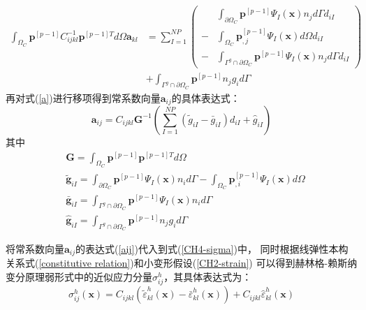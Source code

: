 \begin{equation}\label{a}
\begin{split}
        \int_{\Omega_C}\pmb{p}^{[p-1]}C^{-1}_{ijkl}\pmb{p}^{[p-1]T}d\Omega\pmb{a}_{kl}&=\sum_{I=1}^{N\!P}
        \left (
            \begin{split}
                &\int_{\partial\Omega_C}\pmb{p}^{[p-1]}\Psi_I(\pmb{x})n_jd\Gamma d_{iI} \\
               -&\int_{\Omega_C}\pmb{p}_{,j}^{[p-1]}\Psi_{I}(\pmb{x})d\Omega d_{iI}\\
               -&\int_{\Gamma^g\cap\partial\Omega_C}\pmb{p}^{[p-1]}\Psi_I(\pmb{x})n_jd\Gamma d_{iI}
            \end{split}
         \right ) \\
         &+\int_{\Gamma^g\cap\partial\Omega_C}\pmb{p}^{[p-1]}n_jg_id\Gamma
\end{split}
\end{equation}
再对式(\ref{a})进行移项得到常系数向量$\pmb{a}_{ij}$的具体表达式：
\begin{equation}\label{aij}
 \pmb{a}_{ij}=C_{ijkl}\pmb{G}^{-1}(\sum_{I=1}^{N\!P}(\tilde{g}_{iI}-\bar{g}_{iI})d_{iI}+\hat{g}_{iI})
\end{equation}
其中
\begin{subequations}
\begin{align}
    \label{g1}&\pmb{G}=\int_{\Omega_C}\pmb{p}^{[p-1]}\pmb{p}^{[p-1]T}d\Omega\\
    \label{g2} &\tilde{\pmb g}_{iI}=\int_{\partial\Omega_C}\pmb{p}^{[p-1]}\Psi_I(\pmb{x})n_id\Gamma-\int_{\Omega_C}\pmb{p}_{,i}^{[p-1]}\Psi_{I}(\pmb{x})d\Omega\\
    \label{g3} &\bar{\pmb g}_{iI}=\int_{\Gamma^g\cap\partial\Omega_C}\pmb{p}^{[p-1]}\Psi_I(\pmb{x})n_id\Gamma\\
   \label{g4} &\hat{\pmb g}_{iI}=\int_{\Gamma^g\cap\partial\Omega_C}\pmb{p}^{[p-1]}n_jg_id\Gamma
\end{align}
\end{subequations}\par
将常系数向量$\pmb{a}_{ij}$的表达式(\ref{aij})代入到式(\ref{CH4-sigma})中，
同时根据线弹性本构关系式(\ref{constitutive relation})和小变形假设(\ref{CH2-strain})
可以得到赫林格-赖斯纳变分原理弱形式中的近似应力分量$\sigma^h_{ij}$，其具体表达式为：
\begin{equation}\label{sigmah}
    \sigma^h_{ij}(\pmb{x})=C_{ijkl}(\tilde{\varepsilon}^h_{kl}(\pmb{x})-\bar{\varepsilon}^h_{kl}(\pmb{x}))+C_{ijkl}\hat{\varepsilon}^h_{kl}(\pmb{x})
\end{equation}
